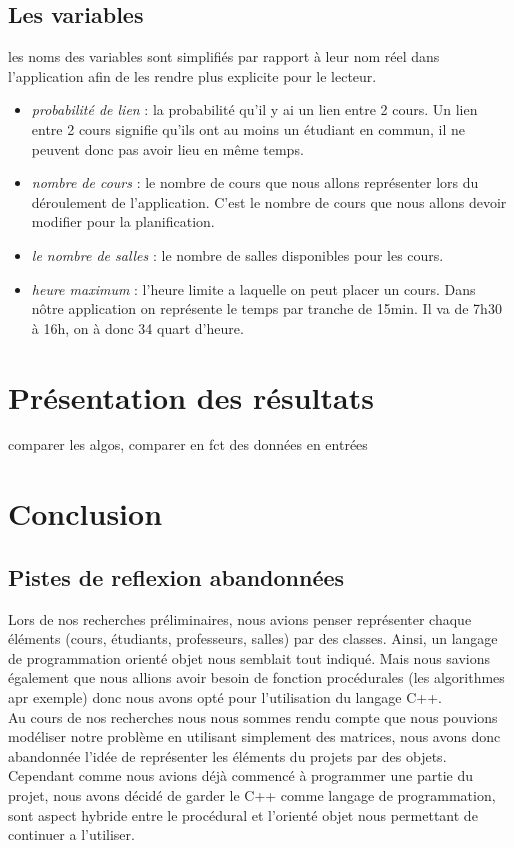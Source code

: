 \documentclass[a4paper,11pt]{article}
\begin{document}
	\subsection{Les variables}
	les noms des variables sont simplifiés par rapport à leur nom réel dans l'application afin de les rendre plus explicite pour le lecteur.
	\begin{itemize}
		\item \textit{probabilité de lien} : la probabilité qu'il y ai un lien entre 2 cours. Un lien entre 2 cours signifie qu'ils ont au moins un étudiant en commun, il ne peuvent donc pas avoir lieu en même temps.
		\item \textit{nombre de cours} : le nombre de cours que nous allons représenter lors du déroulement de l'application. C'est le nombre de cours que nous allons devoir modifier pour la planification.
		\item  \textit{le nombre de salles} : le nombre de salles disponibles pour les cours.
		\item \textit{heure maximum} : l'heure limite a laquelle on peut placer un cours. Dans nôtre application on représente le temps par tranche de 15min. Il va de 7h30 à 16h, on à donc 34 quart d'heure.
	\end{itemize}
\section{Présentation des résultats}
	comparer les algos, comparer en fct des données en entrées
	
\section{Conclusion}
	\subsection{Pistes de reflexion abandonnées}
	Lors de nos recherches préliminaires, nous avions penser représenter chaque éléments (cours, étudiants, professeurs, salles) par des classes. Ainsi, un langage de programmation orienté objet nous semblait tout indiqué. Mais nous savions également que nous allions avoir besoin de fonction procédurales (les algorithmes apr exemple) donc nous avons opté pour l'utilisation du langage C++.\\
	Au cours de nos recherches nous nous sommes rendu compte que nous pouvions modéliser notre problème en utilisant simplement des matrices, nous avons donc abandonnée l'idée de représenter les éléments du projets par des objets.\\
	Cependant comme nous avions déjà commencé à programmer une partie du projet, nous avons décidé de garder le C++ comme langage de programmation, sont aspect hybride entre le procédural et l'orienté objet nous permettant de continuer a l'utiliser.
\end{document}

